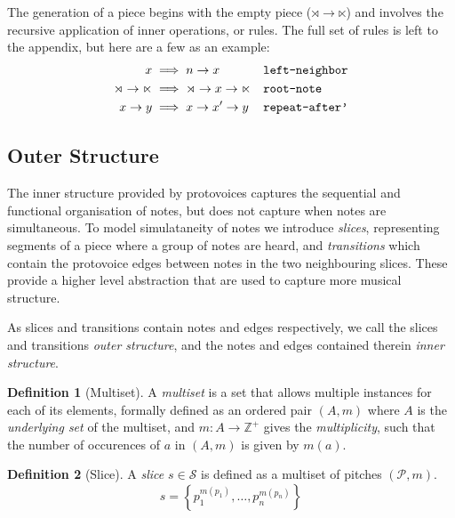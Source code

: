 \documentclass[12pt,a4paper,twoside,openright]{report}
\theoremstyle{definition}
\newtheorem{definition}{Definition}[section]
\begin{document}
The generation of a piece begins with the empty piece ($\rtimes \to \ltimes$) and involves the recursive application of inner operations, or rules. The full set of rules is left to the appendix, but here are a few as an example:
\begin{equation}
  \begin{align}
    x &\implies n \to x && \text{\texttt{left-neighbor}}
  \label{eq:leftNeighbor} \\
    \rtimes \to \ltimes &\implies \rtimes \to x \to \ltimes && \text{\texttt{root-note}}
  \label{eq:rootNote} \\
    x \to y &\implies x \to x' \to y && \text{\texttt{repeat-after'}}
  \label{eq:repeatAfter}\\
  \end{align} 
\end{equation}
\subsection{Outer Structure}
\label{sub:Outer Structure}

The inner structure provided by protovoices captures the sequential and functional organisation of notes, but does not capture when notes are simultaneous. To model simulataneity of notes we introduce \textit{slices}, representing segments of a piece where a group of notes are heard, and \textit{transitions} which contain the protovoice edges between notes in the two neighbouring slices. These provide a higher level abstraction that are used to capture more musical structure. 
\par
As slices and transitions contain notes and edges respectively, we call the slices and transitions \textit{outer structure}, and the notes and edges contained therein \textit{inner structure}.

\begin{definition}[Multiset] A \textit{multiset} is a set that allows multiple instances for each of its elements, formally defined as an ordered pair $(A,m)$ where $A$ is the \textit{underlying set} of the multiset, and $m:A \to \mathbb{Z}^+$ gives the \textit{multiplicity}, such that the number of occurences of $a$ in $(A,m)$ is given by $m(a)$. 
\end{definition}

\begin{definition}[Slice] A \textit{slice} $s \in \mathcal{S}$ is defined as a multiset of pitches $(\mathcal{P}, m)$. 
\begin{equation}
  s = \left\{ p_1^{m(p_1)} , \dots, p_n^{m(p_n)} \right\}  
  \label{eq:sliceDef}
\end{equation}
\end{definition}
\end{document}
